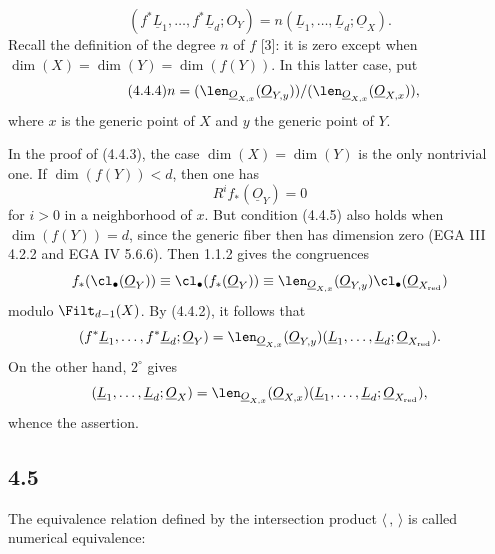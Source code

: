 \begin{enumerate}[label=\arabic*)]
%

\begin{equation}\tag{4.4.3}
 (f^*\underline{L}_1,\ldots,f^*\underline{L}_d;O_Y)
 =
 n(\underline{L}_1,\ldots,\underline{L}_d;\underline{O}_X).
\end{equation}
Recall the definition of the degree \(n\) of \(f\) [3]: it is zero except when \(\dim(X)=\dim(Y)=\dim(f(Y))\). In this latter case, put
\begin{equation}\tag{4.4.4}
 n=(\len_{\underline{O}_{X,x}}(\underline{O}_{Y,y}))/(\len_{\underline{O}_{X,x}}(\underline{O}_{X,x})),
\end{equation}
where \(x\) is the generic point of \(X\) and \(y\) the generic point of \(Y\).
\end{enumerate}

In the proof of (4.4.3), the case \(\dim(X)=\dim(Y)\) is the only nontrivial one. If \(\dim(f(Y))<d\), then one has
\begin{equation}\tag{4.4.5}
 R^if_*(\underline{O}_Y)=0
\end{equation}
for \(i>0\) in a neighborhood of \(x\). But condition (4.4.5) also holds when \(\dim(f(Y))=d\), since the generic fiber then has dimension zero (EGA III 4.2.2 and EGA IV 5.6.6). Then 1.1.2 gives the congruences
\[
 f_*(\cl_\bullet(\underline{O}_Y))
 \equiv \cl_\bullet(f_*(\underline{O}_Y)) \equiv
 \len_{\underline{O}_{X,x}}(\underline{O}_{Y,y})
 \cl_\bullet(\underline{O}_{X_{\mathrm{red}}})
\]
modulo \(\Filt_{d-1}(X)\). By (4.4.2), it follows that
\[
 (f^*\underline{L}_1,\ldots,f^*\underline{L}_d;\underline{O}_Y)
 =
 \len_{\underline{O}_{X,x}}(\underline{O}_{Y,y})
 (\underline{L}_1,\ldots,\underline{L}_d;\underline{O}_{X_{\mathrm{red}}}).
\]
On the other hand, \(2^\circ\) gives
\[
 (\underline{L}_1,\ldots,\underline{L}_d;\underline{O}_X)
 =
 \len_{\underline{O}_{X,x}}(\underline{O}_{X,x})
 (\underline{L}_1,\ldots,\underline{L}_d;\underline{O}_{X_{\mathrm{red}}}),
\]
whence the assertion.


%

\subsection*{4.5}
The equivalence relation defined by the intersection product \(\langle\, ,\,\rangle\) is called numerical equivalence:

